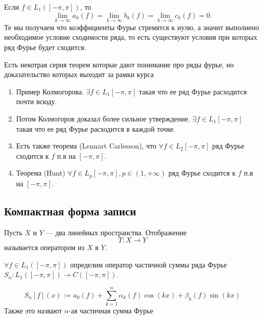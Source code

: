 \begin{corollary}
Если $f \in L_{1}([-\pi,\pi])$, то 
$$
\lim\limits_{k \to \infty}a_{k}(f) = \lim\limits_{k \to \infty}b_{k}(f) = \lim\limits_{k \to \infty}c_{k}(f) = 0.
$$
Те мы получаем что коэффициенты Фурье стремятся к нулю, а значит выполнено необходимое условие сходимости ряда, то есть существуют условия при которых ряд Фурье будет сходится.
\end{corollary}
\begin{note}
    Есть некотрая серия теорем которые дают понимание про ряды фурье, но доказательство которых выходит за рамки курса
    \begin{enumerate}
        \item Пример Колмогорова. $\exists f \in L_1[-\pi,\pi]$ такая что ее ряд Фурье расходится почти всюду.
        \item Потом Колмогоров доказал более сильное утверждение. $\exists f \in L_1[-\pi,\pi]$ такая что ее ряд Фурье расходится в каждой точке.
        \item  Есть также теорема (Lennart Carlesson), что $\forall f \in L_2[-\pi,\pi]$ ряд Фурье сходится к $f$ п.в на $[-\pi,\pi]$.
        \item Теорема (Hunt) $\forall f \in L_p[-\pi,\pi], p \in (1, +\infty)$ ряд Фурье сходится к $f$ п.в на $[-\pi,\pi]$.
    \end{enumerate}



\end{note}

\subsection{Компактная форма записи}
\begin{definition}
    Пусть \( X \) и \( Y \) — два линейных пространства. Отображение
\[
T \colon X \to Y
\]
называется оператором из \( X \) в \( Y \).
\end{definition}

\begin{definition}
$\forall f \in L_1\left([-\pi, \pi]\right)$ определим оператор частичной суммы ряда Фурье $S_n \colon L_1\left([-\pi, \pi]\right) \to C \left([-\pi, \pi]\right)$.

\[
S_n[f](x) := a_0(f) + \sum_{k=1}^{n} \alpha_k(f) \cos(kx) + \beta_k(f) \sin(kx)
\]
Также это назвают $n$-ая частичная сумма Фурье
\end{definition}


